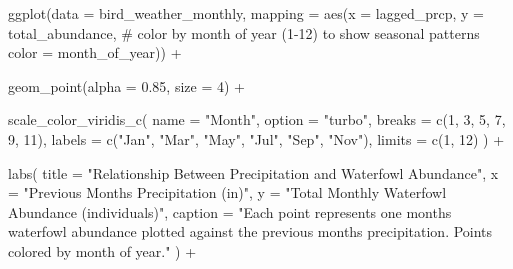 \documentclass[
  letterpaper,
  DIV=11,
  numbers=noendperiod]{scrartcl}
\newenvironment{Shaded}{\begin{snugshade}}{\end{snugshade}}
\newcommand{\AttributeTok}[1]{\textcolor[rgb]{0.40,0.45,0.13}{#1}}
\newcommand{\CommentTok}[1]{\textcolor[rgb]{0.37,0.37,0.37}{#1}}
\newcommand{\DecValTok}[1]{\textcolor[rgb]{0.68,0.00,0.00}{#1}}
\newcommand{\FloatTok}[1]{\textcolor[rgb]{0.68,0.00,0.00}{#1}}
\newcommand{\FunctionTok}[1]{\textcolor[rgb]{0.28,0.35,0.67}{#1}}
\newcommand{\NormalTok}[1]{\textcolor[rgb]{0.00,0.23,0.31}{#1}}
\newcommand{\SpecialCharTok}[1]{\textcolor[rgb]{0.37,0.37,0.37}{#1}}
\newcommand{\StringTok}[1]{\textcolor[rgb]{0.13,0.47,0.30}{#1}}
\begin{document}
\begin{Shaded}
\begin{Highlighting}[]
\FunctionTok{ggplot}\NormalTok{(}\AttributeTok{data =}\NormalTok{ bird\_weather\_monthly,}
       \AttributeTok{mapping =} \FunctionTok{aes}\NormalTok{(}\AttributeTok{x =}\NormalTok{ lagged\_prcp,}
                     \AttributeTok{y =}\NormalTok{ total\_abundance,}
                     \CommentTok{\# color by month of year (1{-}12) to show seasonal patterns}
                     \AttributeTok{color =}\NormalTok{ month\_of\_year)) }\SpecialCharTok{+}

  \FunctionTok{geom\_point}\NormalTok{(}\AttributeTok{alpha =} \FloatTok{0.85}\NormalTok{, }\AttributeTok{size =} \DecValTok{4}\NormalTok{) }\SpecialCharTok{+}

  \FunctionTok{scale\_color\_viridis\_c}\NormalTok{(}
    \AttributeTok{name   =} \StringTok{"Month"}\NormalTok{,}
    \AttributeTok{option =} \StringTok{"turbo"}\NormalTok{,}
    \AttributeTok{breaks =} \FunctionTok{c}\NormalTok{(}\DecValTok{1}\NormalTok{, }\DecValTok{3}\NormalTok{, }\DecValTok{5}\NormalTok{, }\DecValTok{7}\NormalTok{, }\DecValTok{9}\NormalTok{, }\DecValTok{11}\NormalTok{),}
    \AttributeTok{labels =} \FunctionTok{c}\NormalTok{(}\StringTok{"Jan"}\NormalTok{, }\StringTok{"Mar"}\NormalTok{, }\StringTok{"May"}\NormalTok{, }\StringTok{"Jul"}\NormalTok{, }\StringTok{"Sep"}\NormalTok{, }\StringTok{"Nov"}\NormalTok{),}
    \AttributeTok{limits =} \FunctionTok{c}\NormalTok{(}\DecValTok{1}\NormalTok{, }\DecValTok{12}\NormalTok{)}
\NormalTok{  ) }\SpecialCharTok{+}

  \FunctionTok{labs}\NormalTok{(}
    \AttributeTok{title   =} \StringTok{"Relationship Between Precipitation and Waterfowl Abundance"}\NormalTok{,}
    \AttributeTok{x       =} \StringTok{"Previous Month\textquotesingle{}s Precipitation (in)"}\NormalTok{,}
    \AttributeTok{y       =} \StringTok{"Total Monthly Waterfowl Abundance (individuals)"}\NormalTok{,}
    \AttributeTok{caption =} \StringTok{"Each point represents one month\textquotesingle{}s waterfowl abundance plotted}
\StringTok{against the previous month\textquotesingle{}s precipitation. Points colored by month of year."}
\NormalTok{  ) }\SpecialCharTok{+}


\end{Highlighting}
\end{Shaded}
\end{document}
